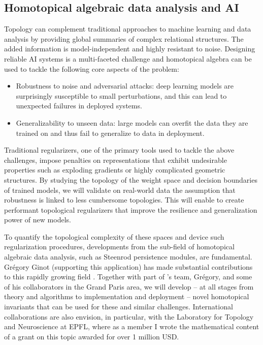 \subsection{Homotopical algebraic data analysis and AI} \label{ss:ai}

Topology can complement traditional approaches to machine learning and data analysis by providing global summaries of complex relational structures.
The added information is model-independent and highly resistant to noise.
Designing reliable AI systems is a multi-faceted challenge and homotopical algebra can be used to tackle the following core aspects of the problem:

\begin{itemize}
	\item Robustness to noise and adversarial attacks: deep learning models are surprisingly susceptible to small perturbations, and this can lead to unexpected failures in deployed systems.
	\item Generalizability to unseen data: large models can overfit the data they are trained on and thus fail to generalize to data in deployment.
\end{itemize}
Traditional regularizers, one of the primary tools used to tackle the above challenges, impose penalties on representations that exhibit undesirable properties such as exploding gradients or highly complicated geometric structures.
By studying the topology of the weight space and decision boundaries of trained models, we will validate on real-world data the assumption that robustness is linked to less cumbersome topologies.
This will enable to create performant topological regularizers that improve the resilience and generalization power of new models.

To quantify the topological complexity of these spaces and device such regularization procedures, developments from the sub-field of homotopical algebraic data analysis, such as Steenrod persistence modules, are fundamental.
Gr\'egory Ginot (supporting this application) has made substantial contributions to this rapidly growing field \cite{ginot2021multiplicative}.
Together with part of \giottoTDA's team, Gr\'egory, and some of his collaborators in the Grand Paris area, we will develop -- at all stages from theory and algorithms to implementation and deployment -- novel homotopical invariants that can be used for these and similar challenges.
International collaborations are also envision, in particular, with the Laboratory for Topology and Neuroscience at EPFL, where as a member I wrote the mathematical content of a grant on this topic awarded for over 1 million USD.

